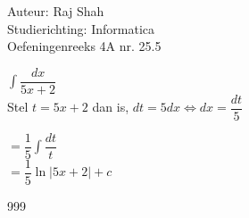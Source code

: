 \documentclass[a4paper]{article}
\begin{document}
  
\noindent \large Auteur: Raj Shah \\
\noindent \large Studierichting: Informatica\\
\noindent \large Oefeningenreeks 4A nr. 25.5 \\

\medskip

\normalsize

$\displaystyle\int \dfrac{dx}{5x+2}$\\

Stel $t = 5x+2$ dan is, $dt = 5dx \Leftrightarrow dx = \dfrac{dt}{5}$

$ = \dfrac{1}{5} \displaystyle\int \dfrac{dt}{t}$\\

$ = \dfrac{1}{5} \ln |5x + 2| + c$\\

\begin{thebibliography}{999}
\end{thebibliography}
\end{document}
